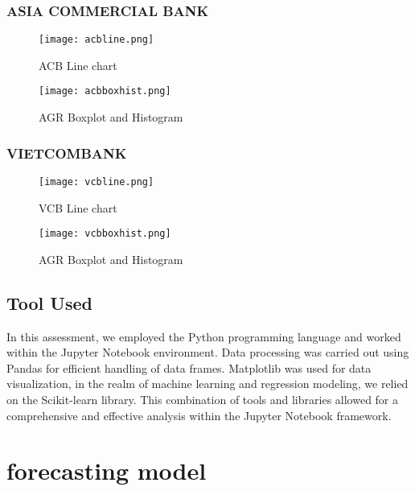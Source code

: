 \documentclass{ieeeojies}
\begin{document}
\subsubsection{ASIA COMMERCIAL BANK}



\begin{figure}[H]
    \centering
    \texttt{[image: acbline.png]}
    \caption{\centering ACB Line chart}
    \label{fig:enter-label}
\end{figure}
\begin{figure}[H]
    \centering
    \texttt{[image: acbboxhist.png]}
    \caption{\centering AGR Boxplot and Histogram}
    \label{fig:enter-label}
\end{figure}


\subsubsection{VIETCOMBANK}


\begin{figure}[H]
    \centering
    \texttt{[image: vcbline.png]}
    \caption{\centering VCB Line chart}
    \label{fig:enter-label}
\end{figure}
\begin{figure}[H]
    \centering
    \texttt{[image: vcbboxhist.png]}
    \caption{\centering AGR Boxplot and Histogram}
    \label{fig:enter-label}
\end{figure}


\subsection{Tool Used}
\hspace{0.4cm}In this assessment, we employed the Python programming language and worked within the Jupyter Notebook environment. Data processing was carried out using Pandas for efficient handling of data frames. Matplotlib was used for data visualization, in the realm of machine learning and regression modeling, we relied on the Scikit-learn library. This combination of tools and libraries allowed for a comprehensive and effective analysis within the Jupyter Notebook framework.


\section{forecasting model}
\end{document}
